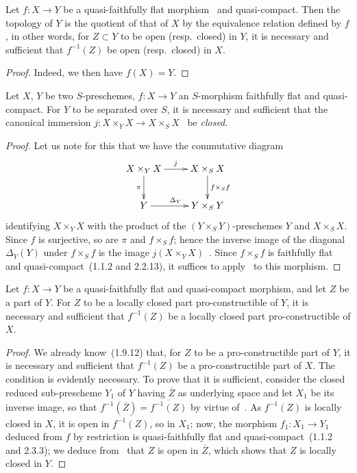 \begin{corollary}[2.3.12]
\label{IV.2.3.12}
Let $f:X\to Y$ be a quasi-faithfully flat morphism~ and quasi-compact.
Then the topology of $Y$ is the quotient of that of $X$ by the equivalence relation defined by $f$, in other words, for $Z\subset Y$ to be open \textnormal{(}resp.\ closed\textnormal{)} in $Y$, it is necessary and sufficient that $f^{-1}(Z)$ be open \textnormal{(}resp.\ closed\textnormal{)} in $X$.
\end{corollary}

\begin{proof}
Indeed, we then have $f(X)=Y$.
\end{proof}

\begin{corollary}[2.3.13]
\label{IV.2.3.13}
Let $X$, $Y$ be two $S$-preschemes, $f:X\to Y$ an $S$-morphism faithfully flat and quasi-compact.
For $Y$ to be separated over $S$, it is necessary and sufficient that the canonical immersion $j:X\times_Y X\to X\times_S X$~ be \emph{closed}.
\end{corollary}

\begin{proof}
Let us note for this that we have the commutative diagram~
\[
\xymatrix{
  X\times_Y X \ar[r]^j \ar[d]_{\pi} & X\times_S X \ar[d]^{f\times_S f}\\
  Y \ar[r]^{\Delta_Y} & Y\times_S Y
}
\]
identifying $X\times_Y X$ with the product of the $(Y\times_S Y)$-preschemes $Y$ and $X\times_S X$.
Since $f$ is surjective, so are $\pi$ and $f\times_S f$; hence the inverse image of the diagonal $\Delta_Y(Y)$ under $f\times_S f$ is the image $j(X\times_Y X)$~.
Since $f\times_S f$ is faithfully flat and quasi-compact~(1.1.2 and 2.2.13), it suffices to apply~ to this morphism.
\end{proof}

\begin{corollary}[2.3.14]
\label{IV.2.3.14}
Let $f:X\to Y$ be a quasi-faithfully flat and quasi-compact morphism, and let $Z$ be a part of $Y$.
For $Z$ to be a locally closed part pro-constructible of $Y$, it is necessary and sufficient that $f^{-1}(Z)$ be a locally closed part pro-constructible of $X$.
\end{corollary}

\begin{proof}
We already know~(1.9.12) that, for $Z$ to be a pro-constructible part of $Y$, it is necessary and sufficient that $f^{-1}(Z)$ be a pro-constructible part of $X$.
The condition is evidently necessary.
To prove that it is sufficient, consider the closed reduced sub-prescheme $Y_1$ of $Y$ having $\overline{Z}$ as underlying space and let $X_1$ be its inverse image, so that $f^{-1}(\overline{Z})=\overline{f^{-1}(Z)}$ by virtue of~.
As $f^{-1}(Z)$ is locally closed in $X$, it is open in $\overline{f^{-1}(Z)}$, so in $X_1$; now, the morphism $f_1:X_1\to Y_1$ deduced from $f$ by restriction is quasi-faithfully flat and quasi-compact~(1.1.2 and 2.3.3); we deduce from~ that $Z$ is open in $\overline{Z}$, which shows that $Z$ is locally closed in $Y$.
\end{proof}

